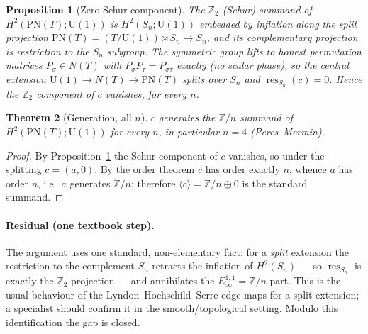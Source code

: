 \documentclass[11pt]{article}
\newtheorem{theorem}{Theorem}[section]
\newtheorem{proposition}[theorem]{Proposition}
\theoremstyle{definition}
\begin{document}
\begin{proposition}[Zero Schur component]\label{prop:zeroschur}
The $\mathbb{Z}_{2}$ (Schur) summand of $H^{2}(\mathrm{PN}(T);\mathrm{U}(1))$ is $H^{2}(S_{n};\mathrm{U}(1))$
embedded by inflation along the split projection $\mathrm{PN}(T)=(T/\mathrm{U}(1))\rtimes S_{n}\to S_{n}$,
and its complementary projection is restriction to the $S_{n}$ subgroup. The symmetric group lifts to
honest permutation matrices $P_{\sigma}\in N(T)$ with $P_{\sigma}P_{\tau}=P_{\sigma\tau}$ \emph{exactly}
(no scalar phase), so the central extension $\mathrm{U}(1)\to N(T)\to\mathrm{PN}(T)$ splits over $S_{n}$
and $\operatorname{res}_{S_{n}}(c)=0$. Hence the $\mathbb{Z}_{2}$ component of $c$ vanishes, for every
$n$.
\end{proposition}

\begin{theorem}[Generation, all $n$]\label{thm:evenN}
$c$ generates the $\mathbb{Z}/n$ summand of $H^{2}(\mathrm{PN}(T);\mathrm{U}(1))$ for every $n$, in
particular $n=4$ (Peres--Mermin).
\end{theorem}
\begin{proof}
By Proposition~\ref{prop:zeroschur} the Schur component of $c$ vanishes, so under the splitting
$c=(a,0)$. By the order theorem $c$ has order exactly $n$, whence $a$ has order $n$, i.e.\ $a$
generates $\mathbb{Z}/n$; therefore $\langle c\rangle=\mathbb{Z}/n\oplus0$ is the standard summand.
\end{proof}

\paragraph{Residual (one textbook step).} The argument uses one standard, non-elementary fact: for a
\emph{split} extension the restriction to the complement $S_{n}$ retracts the inflation of
$H^{2}(S_{n})$ --- so $\operatorname{res}_{S_{n}}$ is exactly the $\mathbb{Z}_{2}$-projection --- and
annihilates the $E_{\infty}^{1,1}=\mathbb{Z}/n$ part. This is the usual behaviour of the
Lyndon--Hochschild--Serre edge maps for a split extension; a specialist should confirm it in the
smooth/topological setting. Modulo this identification the gap is closed.
\end{document}
